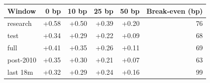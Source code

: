 \begin{tabular}{lrrrrr}
\toprule
Window & 0 bp & 10 bp & 25 bp & 50 bp & Break-even (bp) \\
\midrule
research & +0.58 & +0.50 & +0.39 & +0.20 & 76 \\
test & +0.34 & +0.29 & +0.22 & +0.09 & 68 \\
full & +0.41 & +0.35 & +0.26 & +0.11 & 69 \\
post-2010 & +0.35 & +0.30 & +0.21 & +0.07 & 63 \\
last 18m & +0.32 & +0.29 & +0.24 & +0.16 & 99 \\
\bottomrule
\end{tabular}
